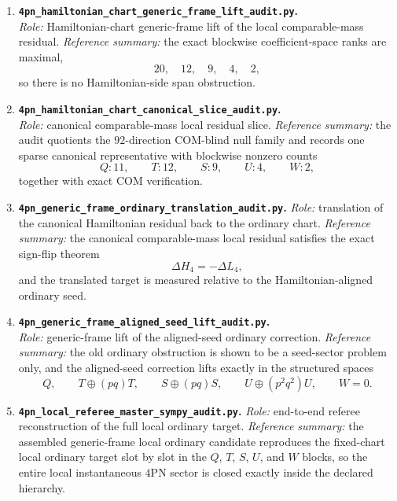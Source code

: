 \documentclass[11pt]{article}
\begin{document}
\begin{enumerate}
  \item \textbf{\nolinkurl{4pn_hamiltonian_chart_generic_frame_lift_audit.py}.}\\
  \emph{Role:} Hamiltonian-chart generic-frame lift of the local comparable-mass
  residual.  \emph{Reference summary:} the exact blockwise coefficient-space
  ranks are maximal,
  \[
  20,\quad 12,\quad 9,\quad 4,\quad 2,
  \]
  so there is no Hamiltonian-side span obstruction.

  \item \textbf{\nolinkurl{4pn_hamiltonian_chart_canonical_slice_audit.py}.}\\
  \emph{Role:} canonical comparable-mass local residual slice.
  \emph{Reference summary:} the audit quotients the $92$-direction COM-blind
  null family and records one sparse canonical representative with blockwise
  nonzero counts
  \[
  Q:11,\qquad T:12,\qquad S:9,\qquad U:4,\qquad W:2,
  \]
  together with exact COM verification.

  \item \textbf{\nolinkurl{4pn_generic_frame_ordinary_translation_audit.py}.}
  \emph{Role:} translation of the canonical Hamiltonian residual back to the
  ordinary chart.  \emph{Reference summary:} the canonical comparable-mass
  local residual satisfies the exact sign-flip theorem
  \[
  \Delta H_4=-\Delta L_4,
  \]
  and the translated target is measured relative to the Hamiltonian-aligned
  ordinary seed.

  \item \textbf{\nolinkurl{4pn_generic_frame_aligned_seed_lift_audit.py}.}\\
  \emph{Role:} generic-frame lift of the aligned-seed ordinary correction.
  \emph{Reference summary:} the old ordinary obstruction is shown to be a
  seed-sector problem only, and the aligned-seed correction lifts exactly in the
  structured spaces
  \[
  Q,
  \qquad
  T\oplus (pq)T,
  \qquad
  S\oplus (pq)S,
  \qquad
  U\oplus (p^2q^2)U,
  \qquad
  W=0.
  \]

  \item \textbf{\nolinkurl{4pn_local_referee_master_sympy_audit.py}.}
  \emph{Role:} end-to-end referee reconstruction of the full local ordinary
  target.  \emph{Reference summary:} the assembled generic-frame local ordinary
  candidate reproduces the fixed-chart local ordinary target slot by slot in the
  $Q$, $T$, $S$, $U$, and $W$ blocks, so the entire local instantaneous $4$PN
  sector is closed exactly inside the declared hierarchy.


\end{enumerate}
\end{document}
